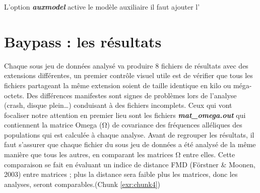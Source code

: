 \documentclass[
  openany]{book}
\newenvironment{Shaded}{\begin{snugshade}}{\end{snugshade}}
\newcommand{\CommentTok}[1]{\textcolor[rgb]{0.56,0.35,0.01}{\textit{#1}}}
\newcommand{\DataTypeTok}[1]{\textcolor[rgb]{0.13,0.29,0.53}{#1}}
\newcommand{\ExtensionTok}[1]{#1}
\newcommand{\NormalTok}[1]{#1}
\newcommand{\VariableTok}[1]{\textcolor[rgb]{0.00,0.00,0.00}{#1}}
\theoremstyle{definition}
\theoremstyle{definition}
\theoremstyle{definition}
\theoremstyle{definition}
\theoremstyle{remark}
\begin{document}
\begin{Shaded}
\end{Shaded}

L'option \textbf{\emph{auxmodel}} active le modèle auxiliaire il faut ajouter l'

\begin{Shaded}
\end{Shaded}

\hypertarget{baypass-les-ruxe9sultats}{%
\chapter*{Baypass : les résultats}\label{baypass-les-ruxe9sultats}}

Chaque sous jeu de données analysé va produire 8 fichiers de résultats avec des extensions différentes, un premier contrôle visuel utile est de vérifier que tous les fichiers partageant la même extension soient de taille identique en kilo ou méga-octets. Des différences manifestes sont signes de problèmes lors de l'analyse (crash, disque plein\ldots) conduisant à des fichiers incomplets. Ceux qui vont focaliser notre attention en premier lieu sont les fichiers \textbf{\emph{mat\_omega.out}} qui contiennent la matrice Omega (Ω) de covariance des fréquences alléliques des populations qui est calculée à chaque analyse. Avant de regrouper les résultats, il faut s'assurer que chaque fichier du sous jeu de données a été analysé de la même manière que tous les autres, en comparant les matrices Ω entre elles.
Cette comparaison se fait en évaluant un indice de distance FMD (Förstner \& Moonen, 2003) entre matrices ; plus la distance sera faible plus les matrices, donc les analyses, seront comparables.(Chunk \ref{exr:chunk4})
\end{document}
